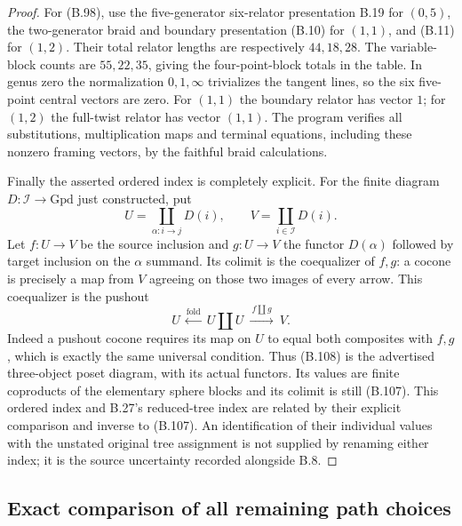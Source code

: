 \begin{proof}
For (B.98), use the five-generator six-relator presentation
B.19 for $(0,5)$, the two-generator braid and boundary
presentation (B.10) for $(1,1)$, and (B.11) for $(1,2)$.
Their total relator lengths are respectively $44,18,28$.
The variable-block counts are $55,22,35$, giving the
four-point-block totals in the table.  In genus zero the
normalization $0,1,\infty$ trivializes the tangent lines,
so the six five-point central vectors are zero.  For
$(1,1)$ the boundary relator has vector $1$; for $(1,2)$
the full-twist relator has vector $(1,1)$.  The program
verifies all substitutions, multiplication maps and
terminal equations, including these nonzero framing
vectors, by the faithful braid calculations.

Finally the asserted ordered index is completely explicit.
For the finite diagram $D:\mathcal I\to\mathrm{Gpd}$ just
constructed, put
\[
 U=\coprod_{\alpha:i\to j}D(i),\qquad
 V=\coprod_{i\in\mathcal I}D(i).
\]
Let $f:U\to V$ be the source inclusion and $g:U\to V$ the
functor $D(\alpha)$ followed by target inclusion on the
$\alpha$ summand.  Its colimit is the coequalizer of $f,g$:
a cocone is precisely a map from $V$ agreeing on those two
images of every arrow.  This coequalizer is the pushout
\[
       U\ \xleftarrow{\mathrm{fold}}\ U\amalg U
           \ \xrightarrow{\ f\amalg g\ }\ V.                 \tag{B.108}
\]
Indeed a pushout cocone requires its map on $U$ to equal
both composites with $f,g$, which is exactly the same
universal condition.  Thus (B.108) is the advertised
three-object poset diagram, with its actual functors.
Its values are finite coproducts of the elementary sphere
blocks and its colimit is still (B.107).  This ordered
index and B.27's reduced-tree index are related by their
explicit comparison and inverse to (B.107).  An
identification of their individual values with the
unstated original tree assignment is not supplied by
renaming either index; it is the source uncertainty
recorded alongside B.8.
\end{proof}

\subsection{Exact comparison of all remaining path choices}

